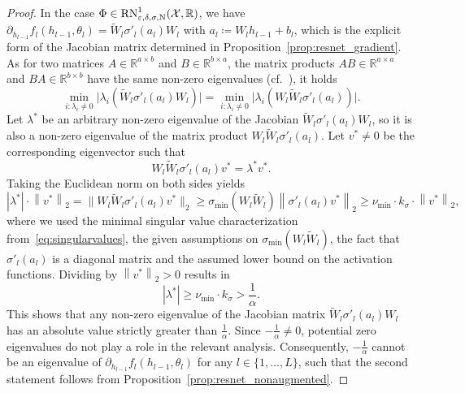 \documentclass[10pt]{article}
\theoremstyle{definition}
\numberwithin{equation}{section}
\newcommand{\eps}{\varepsilon}
\newcommand\norm[1]{\left\lVert#1\right\rVert}
\newcommand\normm[1]{\big\lVert#1\big\lVert}
\newcommand\abs[1]{\left\lvert#1\right\rvert}
\newcommand{\R}{\mathbb{R}}
\begin{document}
\begin{proof}
	In the case $\Phi \in \textup{RN}^1_{\eps,\delta,\sigma,\textup{N}}(\mathcal{X},\R)$, we have $\partial_{h_{l-1}}f_l(h_{l-1},\theta_l) =  \widetilde{W}_{l}\sigma'_{l}(a_{l})W_{l}$ with $a_l \coloneqq W_l h_{l-1} + b_l$, which is the explicit form of the Jacobian matrix determined in Proposition~\ref{prop:resnet_gradient}. As for two matrices $A\in \R^{a\times b}$ and $B \in \R^{b \times a}$, the matrix products $AB \in \R^{a \times a}$ and $BA \in \R^{b \times b}$ have the same non-zero eigenvalues (cf.~\cite{Horn2012}), it holds
    \begin{equation*}
         \min_{i: \lambda_i \neq 0} \vert \lambda_i(\widetilde{W}_l\sigma'_{l}(a_{l})W_l) \vert = \min_{i: \lambda_i \neq 0} \vert \lambda_i(W_l\widetilde{W}_l\sigma'_{l}(a_{l})) \vert.
    \end{equation*}
    Let $\lambda^*$ be an arbitrary non-zero eigenvalue of the Jacobian $\widetilde{W}_l\sigma'_l(a_l)W_l$, so it is also  a non-zero eigenvalue of the matrix product $W_l\widetilde{W}_l\sigma'_l(a_l)$. Let $v^* \neq 0$ be the corresponding eigenvector such that
    \begin{equation*}
        W_l\widetilde{W}_l\sigma'_l(a_l)v^* = \lambda^*v^*.
    \end{equation*}
    Taking the Euclidean norm on both sides yields
    \begin{equation*}
        \abs{\lambda^*}\cdot \norm{v^*}_2 = \normm{W_l\widetilde{W}_l\sigma'_l(a_l)v^*}_2 \geq \sigma_{\min}(W_l\widetilde{W}_l) \norm{\sigma'_l(a_l)v^*}_2 \geq \nu_{\min} \cdot k_\sigma \cdot \norm{v^*}_2,
    \end{equation*}
    where we used the minimal singular value characterization from~\eqref{eq:singularvalues}, the given assumptions on $\sigma_{\min}(W_l\widetilde{W}_l)$, the fact that $\sigma'_l(a_l)$ is a diagonal matrix and the assumed lower bound on the activation functions. Dividing by $\norm{v^*}_2 >0$ results in
    \begin{equation*}
        \abs{\lambda^*} \geq \nu_{\min} \cdot k_\sigma > \frac{1}{\alpha}.
    \end{equation*}
    This shows that any non-zero eigenvalue of the Jacobian matrix $\widetilde{W}_l\sigma'_{l}(a_{l})W_l$ has an absolute value strictly greater than $\frac{1}{\alpha}$. Since $-\frac{1}{\alpha} \neq 0$, potential zero eigenvalues do not play a role in the relevant analysis. Consequently, $-\frac{1}{\alpha}$ cannot be an eigenvalue of $\partial_{h_{l-1}}f_l(h_{l-1},\theta_l)$ for any $l \in \{1,\ldots,L\}$, such that the second statement follows from Proposition~\ref{prop:resnet_nonaugmented}.
\end{proof}
\end{document}
